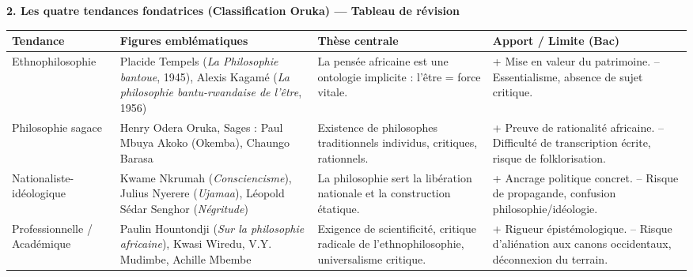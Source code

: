 \documentclass[11pt]{article}
\begin{document}
\textbf{2. Les quatre tendances fondatrices (Classification Oruka) — Tableau de révision}
\begin{center}
\begin{tabularx}{\linewidth}{|l|X|X|X|}
\hline
\rowcolor{popblueL}
\textbf{Tendance} & \textbf{Figures emblématiques} & \textbf{Thèse centrale} & \textbf{Apport / Limite (Bac)} \\
\hline
Ethnophilosophie & Placide Tempels (\emph{La Philosophie bantoue}, 1945), Alexis Kagamé (\emph{La philosophie bantu-rwandaise de l'être}, 1956) & La pensée africaine est une ontologie implicite : l'être = force vitale. & + Mise en valeur du patrimoine. -- Essentialisme, absence de sujet critique. \\
\hline
Philosophie sagace & Henry Odera Oruka, Sages : Paul Mbuya Akoko (Okemba), Chaungo Barasa & Existence de philosophes traditionnels individus, critiques, rationnels. & + Preuve de rationalité africaine. -- Difficulté de transcription écrite, risque de folklorisation. \\
\hline
Nationaliste-idéologique & Kwame Nkrumah (\emph{Consciencisme}), Julius Nyerere (\emph{Ujamaa}), Léopold Sédar Senghor (\emph{Négritude}) & La philosophie sert la libération nationale et la construction étatique. & + Ancrage politique concret. -- Risque de propagande, confusion philosophie/idéologie. \\
\hline
Professionnelle / Académique & Paulin Hountondji (\emph{Sur la philosophie africaine}), Kwasi Wiredu, V.Y. Mudimbe, Achille Mbembe & Exigence de scientificité, critique radicale de l'ethnophilosophie, universalisme critique. & + Rigueur épistémologique. -- Risque d'aliénation aux canons occidentaux, déconnexion du terrain. \\
\hline
\end{tabularx}
\end{center}
\end{document}
